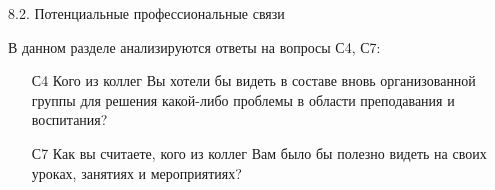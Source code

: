 \begin{frame}{8.2. Потенциальные профессиональные связи }

\tiny

В данном разделе анализируются ответы на вопросы С4, С7:
\bigskip

\begin{itemize}

\item [С4] Кого из коллег Вы хотели бы видеть в составе вновь организованной группы для решения какой-либо проблемы в области преподавания и воспитания?

\item [С7] Как вы считаете, кого из коллег Вам было бы полезно видеть на своих уроках, занятиях и мероприятиях?

\end{itemize}
\end{frame}


